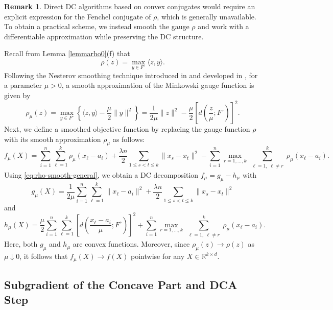 \documentclass[11pt]{article}
\theoremstyle{definition}
\newtheorem{remark}[theorem]{Remark}
\newcommand{\1}{\mathbf{1}}
\begin{document}
\begin{remark}
Direct DC algorithms based on convex conjugates would require an explicit expression for the Fenchel conjugate of $\rho$, which is generally unavailable. To obtain a practical scheme, we instead smooth the gauge $\rho$ and work with a differentiable approximation while preserving the DC structure.
\end{remark}

Recall from Lemma \ref{lemmarho0}(f) that
\[
\rho(z) = \max_{y \in F^\circ} \langle z, y \rangle.
\]
Following the Nesterov smoothing technique introduced in \cite{nesterov2005smooth} and developed in \cite{Nam2017,Nam2018}, for a parameter $\mu > 0$, a smooth approximation of the Minkowski gauge function is given by
\begin{equation}\label{eq:rho-smooth-general}
\rho_\mu(z)=\max_{y \in F^\circ} \left\{
\langle z, y \rangle - \frac{\mu}{2} \|y\|^2
\right\}=\frac{1}{2\mu} \|z\|^2-\frac{\mu}{2} \left[ d\!\left( \frac{z}{\mu}; F^\circ \right) \right]^2.
\end{equation}
Next, we define a smoothed objective function by replacing the gauge function $\rho$ with its smooth approximation $\rho_\mu$ as follows:
\begin{equation}
    \label{eq:fkmu}
f_\mu(X)
=
\sum_{i=1}^n \sum_{\ell=1}^k
\rho_\mu(x_\ell - a_i)
+
\frac{\lambda n}{2}
\sum_{1\le s<t\le k}\|x_s-x_t\|^2-\sum_{i=1}^n
\max_{r=1,\ldots,k}
\sum_{\substack{\ell=1,\;\ell\neq r}}^k \rho_\mu(x_\ell - a_i).
\end{equation} 
Using \eqref{eq:rho-smooth-general}, we obtain a DC decomposition $f_\mu = g_\mu - h_\mu$ with
\begin{equation}\label{gmu}
g_\mu(X)
=
\frac{1}{2\mu}
\sum_{i=1}^n \sum_{\ell=1}^k
\|x_\ell - a_i\|^2
+
\frac{\lambda n}{2}
\sum_{1\le s<t\le k}\|x_s-x_t\|^2    
\end{equation}
and
\begin{equation}\label{hmu}
 h_\mu(X)
=
\frac{\mu}{2}
\sum_{i=1}^n \sum_{\ell=1}^k
\left[ d\!\left( \frac{x_\ell - a_i}{\mu}; F^\circ \right) \right]^2
+
\sum_{i=1}^n
\max_{r=1,\dots,k}
\sum_{\substack{\ell=1,\; \ell \neq r}}^k \rho_\mu(x_\ell - a_i).   
\end{equation}
Here, both $g_\mu$ and $h_\mu$ are convex functions. Moreover, since $\rho_\mu(z) \to \rho(z)$ as $\mu \downarrow 0$, it follows that $f_\mu(X) \to f(X)$ pointwise for any $X \in \mathbb{R}^{k \times d}$.

\subsection{Subgradient of the Concave Part and DCA Step} \label{compY}
\end{document}
